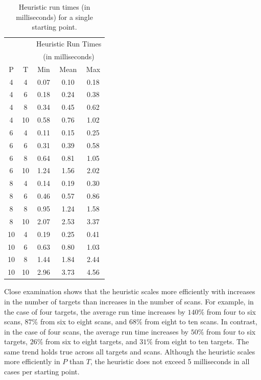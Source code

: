 \begin{table}[ht]
\centering
\begin{tabular}{cc|ccc}
  \hline
   & & \multicolumn{3}{c}{Heuristic Run Times } \\
   & & \multicolumn{3}{c}{(in milliseconds)}\\
   P & T & Min & Mean & Max \\ 
  \hline
  \hline
   4 & 4 & 0.07 & 0.10 & 0.18 \\ 
   4 & 6 & 0.18 & 0.24 & 0.38 \\ 
   4 & 8 & 0.34 & 0.45 & 0.62 \\ 
   4 & 10 & 0.58 & 0.76 & 1.02 \\ 
   6 & 4 & 0.11 & 0.15 & 0.25 \\ 
   6 & 6 & 0.31 & 0.39 & 0.58 \\ 
   6 & 8 & 0.64 & 0.81 & 1.05 \\ 
   6 & 10 & 1.24 & 1.56 & 2.02 \\ 
   8 & 4 & 0.14 & 0.19 & 0.30 \\ 
   8 & 6 & 0.46 & 0.57 & 0.86 \\ 
   8 & 8 & 0.95 & 1.24 & 1.58 \\ 
   8 & 10 & 2.07 & 2.53 & 3.37 \\ 
   10 & 4 & 0.19 & 0.25 & 0.41 \\ 
   10 & 6 & 0.63 & 0.80 & 1.03 \\ 
   10 & 8 & 1.44 & 1.84 & 2.44 \\ 
   10 & 10 & 2.96 & 3.73 & 4.56 \\ 
   \hline
\end{tabular}
\caption{Heuristic run times (in milliseconds) for a single starting point.}
\label{tab:Basic_heuristic_times}
\end{table}

Close examination shows that the heuristic scales more efficiently with increases in the number of targets than increases in the number of scans. For example, in the case of four targets, the average run time increases by $140\%$ from four to six scans, $87\%$ from six to eight scans, and $68\%$ from eight to ten scans. In contrast, in the case of four scans, the average run time increases by $50\%$ from four to six targets, $26\%$ from six to eight targets, and $31\%$ from eight to ten targets. The same trend holds true across all targets and scans. Although the heuristic scales more efficiently in $P$ than $T$, the heuristic does not exceed 5 milliseconds in all cases per starting point. %

